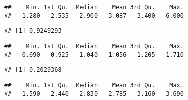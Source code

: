 \documentclass[
]{article}
\newenvironment{Shaded}{\begin{snugshade}}{\end{snugshade}}
\newcommand{\DataTypeTok}[1]{\textcolor[rgb]{0.13,0.29,0.53}{#1}}
\newcommand{\KeywordTok}[1]{\textcolor[rgb]{0.13,0.29,0.53}{\textbf{#1}}}
\newcommand{\NormalTok}[1]{#1}
\newcommand{\OperatorTok}[1]{\textcolor[rgb]{0.81,0.36,0.00}{\textbf{#1}}}
\newcommand{\StringTok}[1]{\textcolor[rgb]{0.31,0.60,0.02}{#1}}
\begin{document}
\begin{verbatim}
##    Min. 1st Qu.  Median    Mean 3rd Qu.    Max. 
##   1.280   2.535   2.900   3.087   3.400   6.000
\end{verbatim}

\begin{Shaded}
\end{Shaded}

\begin{verbatim}
## [1] 0.9249293
\end{verbatim}

\begin{Shaded}
\end{Shaded}

\begin{verbatim}
##    Min. 1st Qu.  Median    Mean 3rd Qu.    Max. 
##   0.690   0.925   1.040   1.056   1.205   1.710
\end{verbatim}

\begin{Shaded}
\end{Shaded}

\begin{verbatim}
## [1] 0.2029368
\end{verbatim}

\begin{Shaded}
\end{Shaded}

\begin{verbatim}
##    Min. 1st Qu.  Median    Mean 3rd Qu.    Max. 
##   1.590   2.440   2.830   2.785   3.160   3.690
\end{verbatim}

\begin{Shaded}
\end{Shaded}
\end{document}
